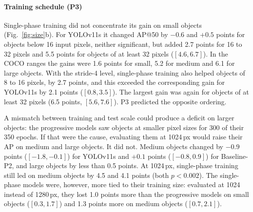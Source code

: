 \documentclass[preprint,12pt]{elsarticle}
\begin{document}
\paragraph{Training schedule (P3)}
Single-phase training did not concentrate its gain on small objects
(Fig.~\ref{fig:size}b). For YOLOv11s it changed AP@50 by $-0.6$ and $+0.5$ points
for objects below 16 input pixels, neither significant, but added 2.7 points for
16 to 32 pixels and 5.5 points for objects of at least 32 pixels ($[4.6, 6.7]$).
In the COCO ranges the gains were 1.6 points for small, 5.2 for medium and 6.1 for
large objects. With the stride-4 level, single-phase training also helped objects
of 8 to 16 pixels, by 2.7 points, and this exceeded the corresponding gain for
YOLOv11s by 2.1 points ($[0.8, 3.5]$). The largest gain was again for objects of
at least 32 pixels (6.5 points, $[5.6, 7.6]$). P3 predicted the opposite ordering.

A mismatch between training and test scale could produce a deficit on larger
objects: the progressive models saw objects at smaller pixel sizes for 300 of their
350 epochs. If that were the cause, evaluating them at 1024\,px would raise their AP
on medium and large objects. It did not. Medium objects changed by $-0.9$ points
($[-1.8, -0.1]$) for YOLOv11s and $+0.1$ points ($[-0.8, 0.9]$) for Baseline-P2,
and large objects by less than 0.5 points. At 1024\,px, single-phase training still
led on medium objects by 4.5 and 4.1 points (both $p<0.002$). The single-phase
models were, however, more tied to their training size: evaluated at 1024 instead
of 1280\,px, they lost 1.0 points more than the progressive models on small objects
($[0.3, 1.7]$) and 1.3 points more on medium objects ($[0.7, 2.1]$).
\end{document}
